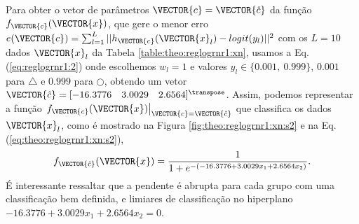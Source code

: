 \begin{SolutionT}\label{sol:theo:reglogrnr1:s2}
Para obter o vetor de parâmetros $\VECTOR{c}=\VECTOR{\hat{c}}$ da função $f_{\VECTOR{c}}(\VECTOR{x})$, 
que gere o menor erro $e(\VECTOR{c}) =  \sum_{l=1}^{L} ||h_{\VECTOR{c}}(\VECTOR{x}_l)-logit(y_l)||^2$
com os $L=10$ dados $\VECTOR{x}_l$ da Tabela \ref{table:theo:reglogrnr1:xn},
usamos a Eq. (\ref{eq:reglogrnr1:2}) onde escolhemos $w_l=1$ e valores $y_l \in \{0.001,~ 0.999\}$,
$0.001$ para $\bigtriangleup$ e $0.999$ para $\bigcirc$,
obtendo um vetor $\VECTOR{\hat{c}}=[-16.3776\quad 3.0029\quad 2.6564]^{\transpose}$. 
Assim, podemos representar a função $\left.f_{\VECTOR{c}}(\VECTOR{x})\right|_{\VECTOR{c}=\VECTOR{\hat{c}}}$ 
que classifica os dados $\VECTOR{x}_l$, 
como é mostrado na Figura \ref{fig:theo:reglogrnr1:xn:s2} e na Eq. (\ref{eq:theo:reglogrnr1:xn:s2}),
\begin{equation}\label{eq:theo:reglogrnr1:xn:s2}
f_{\VECTOR{\hat{c}}}(\VECTOR{x})= \frac{1}{1+e^{-(-16.3776+3.0029 x_1 +2.6564 x_2)}}.
\end{equation}
É interessante ressaltar que a pendente é abrupta para cada grupo com uma classificação bem definida,
e limiares de classificação no hiperplano $-16.3776+3.0029 x_1 +2.6564 x_2=0$.
\end{SolutionT}
